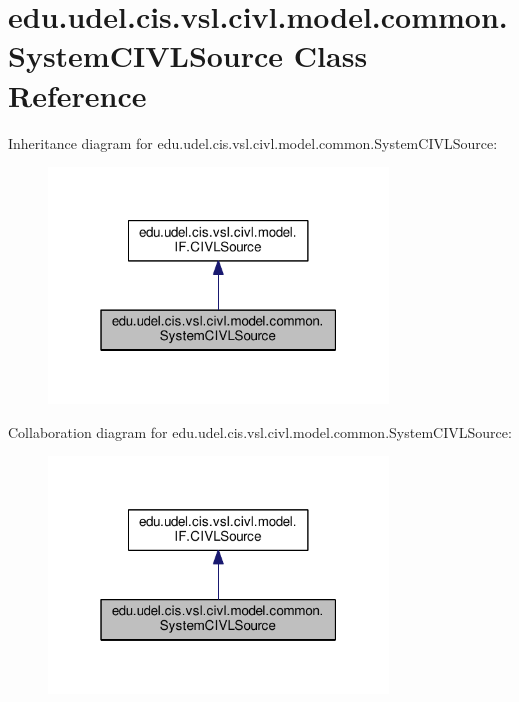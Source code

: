 \hypertarget{classedu_1_1udel_1_1cis_1_1vsl_1_1civl_1_1model_1_1common_1_1SystemCIVLSource}{}\section{edu.\+udel.\+cis.\+vsl.\+civl.\+model.\+common.\+System\+C\+I\+V\+L\+Source Class Reference}
\label{classedu_1_1udel_1_1cis_1_1vsl_1_1civl_1_1model_1_1common_1_1SystemCIVLSource}


Inheritance diagram for edu.\+udel.\+cis.\+vsl.\+civl.\+model.\+common.\+System\+C\+I\+V\+L\+Source\+:
\nopagebreak
\begin{figure}[H]
\begin{center}
\leavevmode
\includegraphics[width=256pt]{classedu_1_1udel_1_1cis_1_1vsl_1_1civl_1_1model_1_1common_1_1SystemCIVLSource__inherit__graph}
\end{center}
\end{figure}


Collaboration diagram for edu.\+udel.\+cis.\+vsl.\+civl.\+model.\+common.\+System\+C\+I\+V\+L\+Source\+:
\nopagebreak
\begin{figure}[H]
\begin{center}
\leavevmode
\includegraphics[width=256pt]{classedu_1_1udel_1_1cis_1_1vsl_1_1civl_1_1model_1_1common_1_1SystemCIVLSource__coll__graph}
\end{center}
\end{figure}
